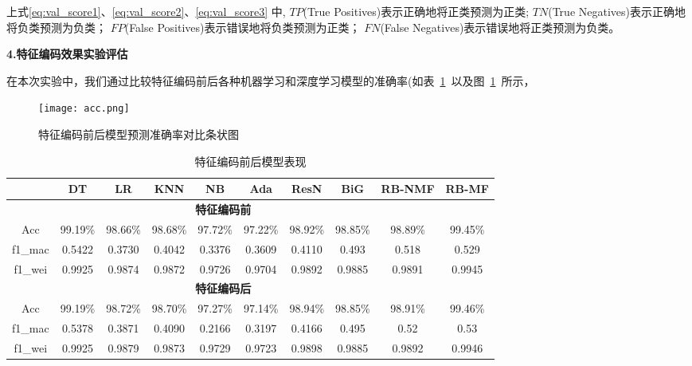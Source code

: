 上式\ref{eq:val_score1}、\ref{eq:val_score2}、\ref{eq:val_score3}%
中,
$TP$(True Positives)表示正确地将正类预测为正类;
$TN$(True Negatives)表示正确地将负类预测为负类；
$FP$(False Positives)表示错误地将负类预测为正类；
$FN$(False Negatives)表示错误地将正类预测为负类。

\textbf{4.特征编码效果实验评估}\par
在本次实验中，我们通过比较特征编码前后各种机器学习和深度学习模型的准确率(如表~\ref{tab:model_performance}~以及图~\ref{fig:comapre_accuracy_encoding}~所示，
\begin{figure}[htbp]
	\centering
	\texttt{[image: acc.png]}
	\caption{特征编码前后模型预测准确率对比条状图}
	\label{fig:comapre_accuracy_encoding}
\end{figure}
\begin{table}[htbp]
	\centering
	\setlength{\tabcolsep}{1pt}
	\caption{特征编码前后模型表现}
	\label{tab:model_performance}
	\begin{tabular}{cccccccccc}
		\toprule
		        & DT               & LR              & KNN             & NB             & Ada               & ResN            & BiG           & RB-NMF          & RB-MF           \\
		\midrule
		\multicolumn{9}{c}{\textbf{特征编码前}}                                                                                                                                   \\
		Acc     & 99.19\%          & 98.66\%         & 98.68\%         & 97.72\%        & 97.22\%           & 98.92\%         & 98.85\%       & 98.89\%         & 99.45\%         \\
		f1\_mac & 0.5422           & 0.3730          & 0.4042          & 0.3376         & 0.3609            & 0.4110          & 0.493         & 0.518           & 0.529           \\
		f1\_wei & 0.9925           & 0.9874          & 0.9872          & 0.9726         & 0.9704            & 0.9892          & 0.9885        & 0.9891          & 0.9945          \\
		\midrule
		\multicolumn{9}{c}{\textbf{特征编码后}}                                                                                                                                   \\
		Acc     & 99.19\%          & 98.72\%\uparrow & 98.70\%\uparrow & 97.27\%        & 97.14\%\downarrow & 98.94\%\uparrow & 98.85\%       & 98.91\%\uparrow & 99.46\%\uparrow \\
		f1\_mac & 0.5378\downarrow & 0.3871\uparrow  & 0.4090\uparrow  & 0.2166         & 0.3197\downarrow  & 0.4166\uparrow  & 0.495\uparrow & 0.52\uparrow    & 0.53\uparrow    \\
		f1\_wei & 0.9925           & 0.9879\uparrow  & 0.9873\uparrow  & 0.9729\uparrow & 0.9723\uparrow    & 0.9898\uparrow  & 0.9885        & 0.9892\uparrow  & 0.9946\uparrow  \\
		\bottomrule
	\end{tabular}
\end{table}
